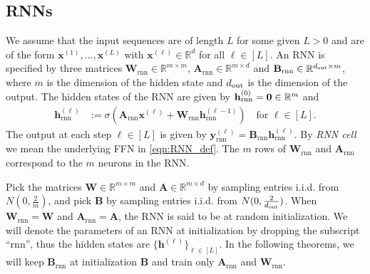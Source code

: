 \subsection{RNNs}
\begin{definition}\label{def:RNN}
	We assume that the input sequences are of length $L$ for some given $L >0$ and are of the form $\mathbf{x}^{(1)}, \ldots, \mathbf{x}^{(L)}$ with $\mathbf{x}^{(\ell)} \in \mathbb{R}^{d}$ for all $\ell \in [L]$. An RNN is specified by three matrices $\mathbf{W}_{\mathrm{rnn}} \in \mathbb{R}^{m \times m}$, $\mathbf{A}_{\mathrm{rnn}} \in \mathbb{R}^{m \times d}$ and $\mathbf{B}_{\mathrm{rnn}}  \in \mathbb{R}^{d_{\mathrm{out}}  \times m}$, where $m$ is the dimension of the hidden state and $d_{\mathrm{out}} $ is the dimension of the output. The hidden states of the RNN are given by $\mathbf{h}^{(0)}_{\mathrm{rnn}} = \mathbf{0} \in \mathbb{R}^m$ and 
	\begin{align} \label{eqn:RNN_def}
		\mathbf{h}^{(\ell)}_{\mathrm{rnn}} &:=  \sigma(\mathbf{A}_{\mathrm{rnn}} \mathbf{x}^{(\ell)} + \mathbf{W}_{\mathrm{rnn}} \mathbf{h}^{(\ell-1)}_{\mathrm{rnn}} ) \quad \text{for } \ell \in [L].
	\end{align}
	The output at each step $\ell \in [L]$ is given by 
	$ \mathbf{y}^{(\ell)}_{\mathrm{rnn}} = \mathbf{B}_{\mathrm{rnn}} \mathbf{h}^{(\ell)}_{\mathrm{rnn}}$. By \emph{RNN cell} we mean the underlying FFN in \eqref{eqn:RNN_def}.
	The $m$ rows of $\mathbf{W}_{\mathrm{rnn}}$ and $\mathbf{A}_{\mathrm{rnn}}$ correspond to the $m$ neurons in the RNN.
	
	
	Pick the matrices $ \mathbf{W} \in \mathbb{R}^{m \times m}$ and $\mathbf{A} \in \mathbb{R}^{m \times d}$ by sampling entries i.i.d. from $N(0, \frac{2}{m})$, and pick $\mathbf{B}$ by sampling entries i.i.d. from $N(0, \frac{2}{d_{\mathrm{out}} })$. When $\mathbf{W}_{\mathrm{rnn}} = \mathbf{W} $ and $\mathbf{A}_{\mathrm{rnn}} = \mathbf{A} $, the RNN is said to be at random initialization. %
	We will denote the parameters of an RNN at initialization by dropping the subscript ``rnn'', thus the hidden states are $\{\mathbf{h}^{(\ell)}\}_{\ell \in [L]}$. 
	In the following theorems, we will keep $\mathbf{B}_{\mathrm{rnn}}$ at initialization $\mathbf{B}$ and train only $\mathbf{A}_{\mathrm{rnn}}$ and $\mathbf{W}_{\mathrm{rnn}}$. %
	

\end{definition}
